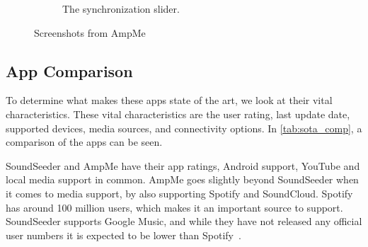 \begin{figure}[h!]
\begin{subfigure}[b]{0.45\textwidth}
        \caption{The synchronization slider.}\label{fig:ampme_slider}
    \end{subfigure}
    \caption{Screenshots from AmpMe}\label{fig:ampme_screenshots}
\end{figure}

\subsection{App Comparison}\label{ssec:app_comparison}
To determine what makes these apps state of the art, we look at their vital characteristics.
These vital characteristics are the user rating, last update date, supported devices, media sources, and connectivity options.
In \cref{tab:sota_comp}, a comparison of the apps can be seen.

\bigskip

SoundSeeder and AmpMe have their app ratings, Android support, YouTube and local media support in common.
AmpMe goes slightly beyond SoundSeeder when it comes to media support, by also supporting Spotify and SoundCloud.
Spotify has around 100 million users, which makes it an important source to support\cite{spotify_subscribers}.
SoundSeeder supports Google Music, and while they have not released any official user numbers it is expected to be lower than Spotify~\cite{googlem_subscribers}.

